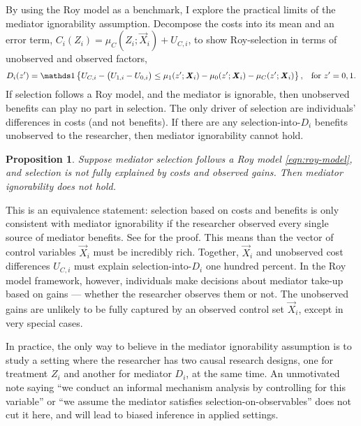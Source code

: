 By using the Roy model as a benchmark, I explore the practical limits of the mediator ignorability assumption.
Decompose the costs into its mean and an error term, $C_i(Z_i) = \mu_{C}(Z_i; \vec X_i) + U_{C,i}$, to show Roy-selection in terms of unobserved and observed factors,
\[ D_i(z') = \indicator{
    U_{C,i} - \big(U_{1,i} - U_{0,i}\big) \leq
        \mu_1(z'; \vec X_i) - \mu_0(z'; \vec X_i) - \mu_C(z'; \vec X_i)
    }, \;\;\; \text{for } z' = 0, 1. \]
If selection follows a Roy model, and the mediator is ignorable, then unobserved benefits can play no part in selection.
The only driver of selection are individuals' differences in costs (and not benefits).
If there are any selection-into-$D_i$ benefits unobserved to the researcher, then mediator ignorability cannot hold.
\newtheorem{proposition}{Proposition}
\begin{proposition}
    \label{prop:roy-seq-ig}
    Suppose mediator selection follows a Roy model \eqref{eqn:roy-model}, and selection is not fully explained by costs and observed gains.
    Then mediator ignorability does not hold.
\end{proposition}

This is an equivalence statement: selection based on costs and benefits is only consistent with mediator ignorability if the researcher observed every single source of mediator benefits.
See  for the proof.
This means than the vector of control variables $\vec X_i$ must be incredibly rich.
Together, $\vec X_i$ and unobserved cost differences $U_{C,i}$ must explain selection-into-$D_i$ one hundred percent.
In the Roy model framework, however, individuals make decisions about mediator take-up based on gains --- whether the researcher observes them or not.
The unobserved gains are unlikely to be fully captured by an observed control set $\vec X_i$, except in very special cases.

In practice, the only way to believe in the mediator ignorability assumption is to study a setting where the researcher has two causal research designs, one for treatment $Z_i$ and another for mediator $D_i$, at the same time.
An unmotivated note saying 
``we conduct an informal mechanism analysis by controlling for this variable''
or
``we assume the mediator satisfies selection-on-observables''
does not cut it here, and will lead to biased inference in applied settings.

% 
% 
% 
